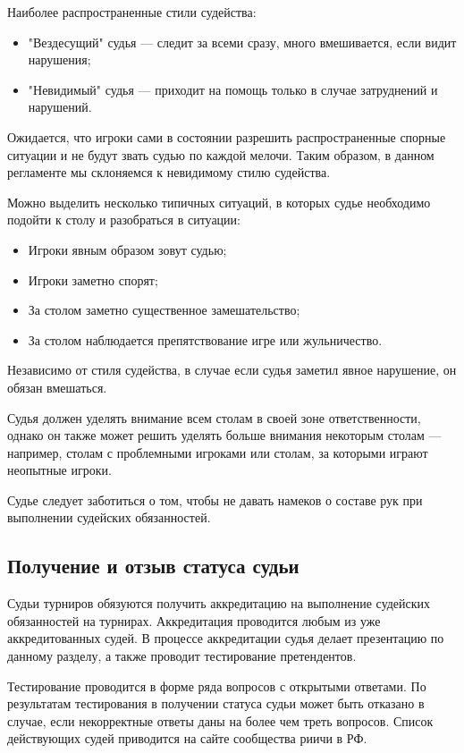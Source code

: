 Наиболее распространенные стили судейства:
\begin{itemize}
	\item "Вездесущий" судья --- следит за всеми сразу, много вмешивается, если видит нарушения;
	\item "Невидимый" судья --- приходит на помощь только в случае затруднений и нарушений.
\end{itemize}

Ожидается, что игроки сами в состоянии разрешить распространенные спорные ситуации и не будут звать судью по каждой мелочи. Таким образом, в данном регламенте мы склоняемся к невидимому стилю судейства.

Можно выделить несколько типичных ситуаций, в которых судье необходимо подойти к столу и разобраться в ситуации:
\begin{itemize}
	\item Игроки явным образом зовут судью;
	\item Игроки заметно спорят;
	\item За столом заметно существенное замешательство;
	\item За столом наблюдается препятствование игре или жульничество.
\end{itemize}

Независимо от стиля судейства, в случае если судья заметил явное нарушение, он обязан вмешаться.

Судья должен уделять внимание всем столам в своей зоне ответственности, однако он также может решить уделять больше внимания некоторым столам --- например, столам с проблемными игроками или столам, за которыми играют неопытные игроки.

Судье следует заботиться о том, чтобы не давать намеков о составе рук при выполнении судейских обязанностей.

\subsection{Получение и отзыв статуса судьи}

Судьи турниров обязуются получить аккредитацию на выполнение судейских обязанностей на турнирах. Аккредитация проводится любым из уже аккредитованных судей. В процессе аккредитации судья делает презентацию по данному разделу, а также проводит тестирование претендентов.

Тестирование проводится в форме ряда вопросов с открытыми ответами. По результатам тестирования в получении статуса судьи может быть отказано в случае, если некорректные ответы даны на более чем треть вопросов. Список действующих судей приводится на сайте сообщества риичи в РФ.


